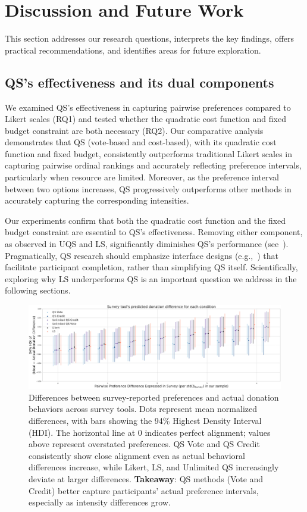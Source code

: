 \section{Discussion and Future Work}
\label{sec:discussion}
This section addresses our research questions, interprets the key findings, offers practical recommendations, and identifies areas for future exploration.

\subsection{QS's effectiveness and its dual components}
We examined QS's effectiveness in capturing pairwise preferences compared to Likert scales (RQ1) and tested whether the quadratic cost function and fixed budget constraint are both necessary (RQ2). Our comparative analysis demonstrates that QS (vote-based and cost-based), with its quadratic cost function and fixed budget, consistently outperforms traditional Likert scales in capturing pairwise ordinal rankings and accurately reflecting preference intervals, particularly when resource are limited. Moreover, as the preference interval between two options increases, QS progressively outperforms other methods in accurately capturing the corresponding intensities.

Our experiments confirm that both the quadratic cost function and the fixed budget constraint are essential to QS's effectiveness. Removing either component, as observed in UQS and LS, significantly diminishes QS's performance (see~). Pragmatically, QS research should emphasize interface designs (e.g.,~\cite{chengOrganizeThenVote2025}) that facilitate participant completion, rather than simplifying QS itself. Scientifically, exploring why LS underperforms QS is an important question we address in the following sections.


\begin{figure}[h]
    \centering
    \includegraphics[width=\textwidth]{content/image/posterior_predictive_cumulative.pdf}
    \caption{Differences between survey-reported preferences and actual donation behaviors across survey tools. Dots represent mean normalized differences, with bars showing the 94\% Highest Density Interval (HDI). The horizontal line at 0 indicates perfect alignment; values above represent overstated preferences. QS Vote and QS Credit consistently show close alignment even as actual behavioral differences increase, while Likert, LS, and Unlimited QS increasingly deviate at larger differences. \textbf{Takeaway}: QS methods (Vote and Credit) better capture participants' actual preference intervals, especially as intensity differences grow.}
    \label{fig:comparison}
\end{figure}

